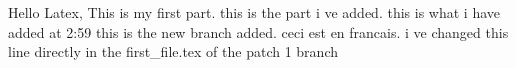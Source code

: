 \documentclass[a4paper]{article}
\begin{document}
Hello Latex, This is my first part.\newline
this is the part i ve added.\newline
this is what i have added at 2:59\newline
this is the new branch added.
ceci est en francais.
i ve changed this line directly in the first_file.tex of the patch 1 branch

\end{document}
